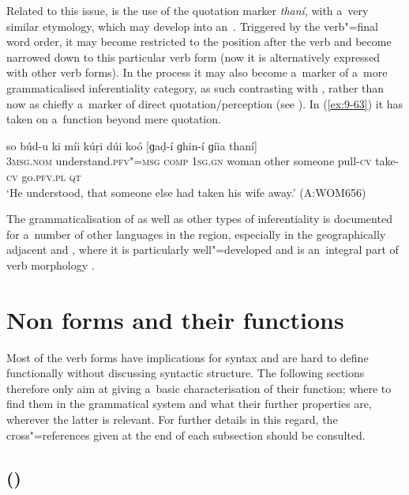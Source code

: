 Related to this issue, is the use of the quotation marker \textit{thaní}, with a~very similar etymology, which may develop into an~. Triggered by the verb"=final word order, it may become restricted to the position after the  verb and become narrowed down to this particular verb form (now it is alternatively expressed with other verb forms). In the process it may also become a~marker of a~more grammaticalised inferentiality category, as such contrasting with , rather than now as chiefly a~marker of direct quotation/perception (see ). In (\ref{ex:9-63}) it has taken on a~function beyond mere quotation.

\begin{exe}
\ex
\label{ex:9-63}
\gll so búd-u ki míi kúṛi dúi koó [ɡaḍ-í ɡhin-í ɡíia thaní]  \\
\textsc{3msg.nom} understand.\textsc{pfv"=msg} \textsc{comp} \textsc{1sg.gn} woman  other someone pull-\textsc{cv} take-\textsc{cv} go.\textsc{pfv.pl} \textsc{qt} \\
\glt `He understood, that someone else had taken his wife away.' (A:WOM656)
\end{exe}

The grammaticalisation of  as well as other types of inferentiality is documented for a~number of other languages in the region, especially in the geographically adjacent  and , where it is particularly well"=developed and is an~integral part of verb morphology \citep{bashir1996}. 


\section{Non forms and their functions}
\label{sec:9-3}

Most of the  verb forms have implications for syntax and are hard to define functionally without discussing syntactic structure. The following sections therefore only aim at giving a~basic characterisation of their function; where to find them in the grammatical system and what their further  properties are, wherever the latter is relevant. For further details in this regard, the cross"=references given at the end of each subsection should be consulted. 


\subsection{ () }
\label{subsec:9-3-1}


